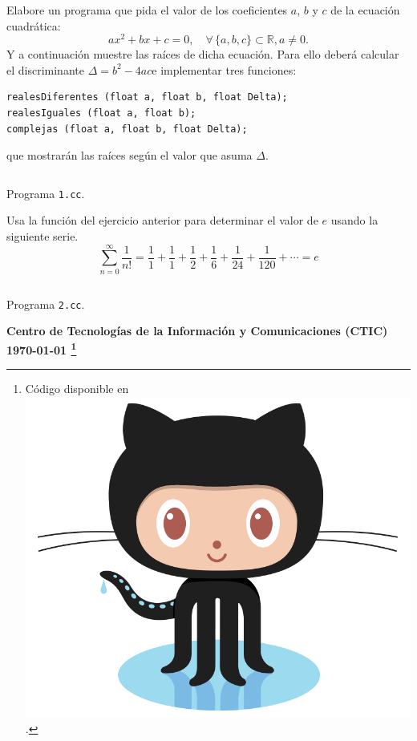 \documentclass[spanish,addpoints,answers,a4paper]{exam}
\newcommand{\unmarkedfntext}[1]{%
	\begingroup
	\renewcommand\thefootnote{}\footnote{#1}%
	\addtocounter{footnote}{-1}%
	\endgroup
}
\newcommand{\mychar}{%
	\begingroup\normalfont
	\includegraphics[height=\fontcharht\font`\B]{Octocat.png}%
	\endgroup
}
\begin{document}
\begin{questions}

\question Elabore un programa que pida el valor de los coeficientes $a$, $b$ y $c$ de la ecuación cuadrática:
\begin{equation*}
ax^2+bx+c=0,\quad\forall\,\{a, b, c\}\subset\mathbb{R}, a\neq 0.
\end{equation*}
Y a continuación muestre las raíces de dicha ecuación. Para ello deberá calcular el discriminante $\Delta = b^2-4ac$\linebreak e implementar tres funciones:
\begin{verbatim}
realesDiferentes (float a, float b, float Delta);
realesIguales (float a, float b);
complejas (float a, float b, float Delta);
\end{verbatim}
que mostrarán las raíces según el valor que asuma $\Delta$.

\begin{solution}
	\begin{listing}[H]
		\footnotesize
		\inputminted{cpp}{1.cc}
		\caption{Programa \texttt{1.cc}.}
		\label{lst:1.9}
\end{listing}
\end{solution}

\question Usa la función del ejercicio anterior para determinar el valor de $e$ usando la siguiente serie.
\begin{equation*}
\sum_{n=0}^\infty\frac{1}{n!}=\frac{1}{1}+\frac{1}{1}+\frac{1}{2}+\frac{1}{6}+\frac{1}{24}+\frac{1}{120}+\cdots=e
\end{equation*}

\begin{solution}
	\begin{listing}[H]
		\footnotesize
		\inputminted{cpp}{2.cc}
		\caption{Programa \texttt{2.cc}.}
		\label{lst:1.10}
\end{listing}
\end{solution}

\end{questions}

\begin{flushright}\bfseries
Centro de Tecnologías de la Información y Comunicaciones (CTIC)\\[2mm]
\today\unmarkedfntext{Código disponible en \href{https://github.com/carlosal1015/Cpp-Programming}{\mychar{}}.}
\end{flushright}
\end{document}
